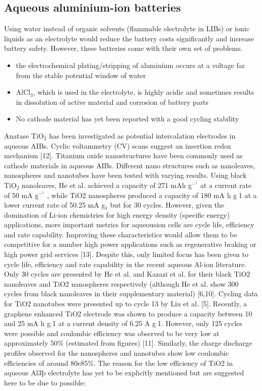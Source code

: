 \subsection{Aqueous aluminium-ion batteries}
Using water instead of organic solvents (flammable electrolyte in LIBs) or ionic liquids as an electrolyte would reduce the battery costs significantly and increase battery safety.
However, these batteries come with their own set of problems. 
\begin{itemize}
    \item the electrochemical plating/stripping of aluminium occurs at a
    voltage far from the stable potential window of water
    \item AlCl$_3$, which is used in the electrolyte, is highly acidic and sometimes results in dissolution of active material and corrosion of battery parts
    \item No cathode material has yet been reported with a good cycling stability 
\end{itemize}  
  Anatase TiO$_2$ has been investigated as potential intercalation electrodes in aqueous AIBs. Cyclic voltammetry (CV) scans suggest an insertion redox mechanism [12]. Titanium oxide nanostructures have been commonly used as cathode materials in aqueous AIBs. Different nano structures such as nanoleaves\cite{}, nanospheres\cite{} and nanotubes\cite{} have been tested with varying results. Using black TiO$_2$ nanoleaves, He et al. achieved a capacity of 271 mAh g$^-^1$ at a current rate of 50 mA g$^-^1$ , while TiO2 nanospheres produced a capacity of 180 mA h g1 at a lower current rate of 50.25 mA g$_1$ but for 30 cycles. However, given the domination of Li-ion chemistries for high energy density (specific energy) applications, more important metrics for aqueousion cells are cycle life, efficiency and rate capability. Improving these characteristics would allow them to be competitive for a number high power applications such as regenerative braking or high power grid services [13]. Despite this, only limited focus has been given to cycle life, efficiency and rate capability in the recent aqueous Al-ion literature. Only 30 cycles are presented by He et al. and Kazazi et al. for their black TiO2 nanoleaves and TiO2 nanospheres respectively (although He et al. show 300 cycles from black nanoleaves in their supplementary material) [6,10]. Cycling data for TiO2 nanotubes were presented up to cycle 13 by Liu et al. [5]. Recently, a graphene enhanced TiO2 electrode was shown to produce a capacity between 10 and 25 mA h g1 at a current density of 6.25 A g1. However, only 125 cycles were possible and coulombic efficiency was observed to be very low at approximately 50\% (estimated from figures) [11]. Similarly, the charge discharge profiles observed for the nanospheres and nanotubes show low coulombic efficiencies of around 80e85\%. The reason for the low efficiency of TiO2 in aqueous Al3þ electrolyte has yet to be explicitly mentioned but are suggested here to be due to possible:
